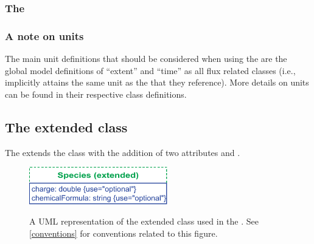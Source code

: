\subsubsection{The \FBC {}}
\label{listofuserdefinedconstraints-class}


\subsubsection{A note on units}
\label{fbcunits}
The main unit definitions that should be considered when using the \FBCPackage
are the global model definitions of ``extent''  and ``time'' as all \FBC flux
related classes (i.e., %
\FluxObjective implicitly attains the same
unit as the \Reaction that they reference). More details on units can be found
in their respective class definitions.

\subsection{The extended  class}
\label{species-class}

The \FBCPackage extends the \sbmlthreecore \Species class with the addition
of two attributes  and .
%
\begin{figure}[h]
  \centering
  \includegraphics[width=6cm]{images/v3harmony_fbc_species.pdf}\\
  \caption{A UML representation of the extended \SBML \Species class used in
  the \FBCPackage. See \ref{conventions} for conventions related to this
  figure.}
  \label{fig:fbc_uml_species}
\end{figure}


